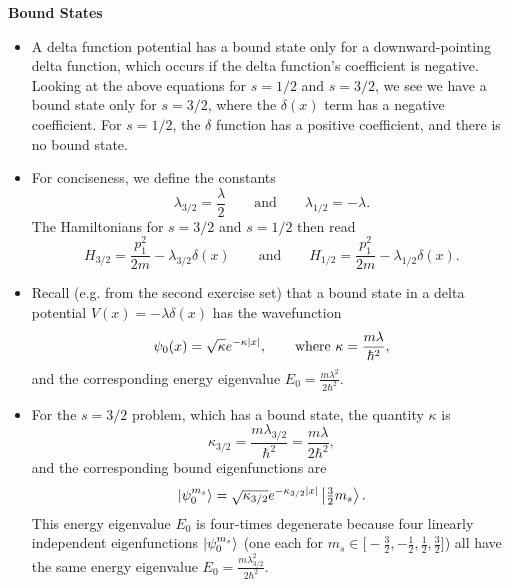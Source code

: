 \documentclass[11pt, a4paper]{article}
\newcommand{\eqtext}[1]{\qquad \text{#1} \qquad}
\newcommand{\Ham}{Hamiltonian\xspace}
\begin{document}
\textbf{Bound States}
\begin{itemize}	
	\item A delta function potential has a bound state only for a downward-pointing delta function, which occurs if the delta function's coefficient is negative. Looking at the above equations for $ s = 1/2$ and $ s = 3/2 $, we see we have a bound state only for $ s = 3/2 $, where the $ \delta(x) $ term has a negative coefficient. For $ s = 1/2 $, the $ \delta $ function has a positive coefficient, and there is no bound state.
	
	\item For conciseness, we define the constants 
	\begin{equation*}
		\lambda_{3/2} = \frac{\lambda}{2} \eqtext{and} \lambda_{1/2} = - \lambda.
	\end{equation*}
	The \Ham{}s for $ s = 3/2 $ and $ s = 1/2 $ then read
	\begin{equation*}
		H_{3/2} = \frac{p_{1}^{2}}{2m} - \lambda_{3/2}\delta(x) \eqtext{and} H_{1/2} = \frac{p_{1}^{2}}{2m} - \lambda_{1/2}\delta(x).
	\end{equation*}
		
	\item Recall (e.g. from the second exercise set) that a bound state in a delta potential $ V(x) = - \lambda \delta(x) $ has the wavefunction
	\begin{equation*}
		 \psi_{0}(x) = \sqrt{\kappa} e^{-\kappa \abs{x}}, \qquad \text{where } \kappa = \frac{m\lambda}{\hbar^{2}},
	\end{equation*}
	and the corresponding energy eigenvalue $  E_{0} = \frac{m\lambda^{2}}{2\hbar^{2}} $.
	
	
	\item For the $ s = 3/2 $ problem, which has a bound state, the quantity $ \kappa $ is
	\begin{equation*}
		\kappa_{3/2} = \frac{m\lambda_{3/2}}{\hbar^{2}} = \frac{m\lambda}{2\hbar^{2}},
	\end{equation*}
	and the corresponding bound eigenfunctions are
	\begin{equation*}
		\ket{\psi_{0}^{m_{s}}} = \sqrt{\kappa_{3/2}}e^{-\kappa_{3/2}\abs{x}} \ket{\tfrac{3}{2}m_{s}}.
	\end{equation*}	
	This energy eigenvalue $ E_{0} $ is four-times degenerate because four linearly independent eigenfunctions $ \ket{\psi_{0}^{m_{s}}} $ (one each for $ m_{s} \in \big[-\frac{3}{2}, -\frac{1}{2}, \frac{1}{2}, \frac{3}{2}\big] $) all have the same energy eigenvalue $ E_{0} = \frac{m\lambda_{3/2}^{2}}{2\hbar^{2}} $. 
	

\end{itemize}
\end{document}
